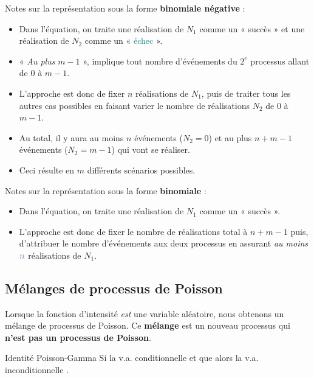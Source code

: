\documentclass[french]{article}
\begin{document}
\begin{multicols*}{2}
Notes sur la représentation sous la forme \textbf{binomiale négative} :
\begin{itemize}
	\item	Dans l'équation, on traite une réalisation de $N_{1}$ comme un « \textcolor{amethyst}{succès} » et une réalisation de $N_{2}$ comme un « \textcolor{teal}{échec} ».
	\item	« \textit{Au plus} $m - 1$ », implique tout nombre d'événements du $2^{e}$ processus allant de $0$ à $m - 1$. 
	\item	L'approche est donc de fixer $n$ réalisations de $N_{1}$, puis de traiter tous les autres cas possibles en faisant varier le nombre de réalisations $N_{2}$ de $0$ à $m - 1$.
	\item	Au total, il y aura au moins $n$ événements ($N_{2} = 0$) et au plus $n + m - 1$ événements  ($N_{2} = m - 1$) qui vont se réaliser.
	\item	Ceci résulte en $m$ différents scénarios possibles. 
\end{itemize}

Notes sur la représentation sous la forme \textbf{binomiale} :
\begin{itemize}
	\item	Dans l'équation, on traite une réalisation de $N_{1}$ comme un « \textcolor{amethyst}{succès} ».
	\item	L'approche est donc de fixer le nombre de réalisations total à $n + m - 1$ puis, d'attribuer le nombre d'événements aux deux processus en assurant \textit{au moins} $\textcolor{amethyst}{n}$ réalisations de $N_{1}$.
\end{itemize}


\columnbreak
\subsection{Mélanges de processus de Poisson}
Lorsque la fonction d'intensité \textit{est} une variable aléatoire, nous obtenons un mélange de processus de Poisson. Ce \textbf{mélange} est un nouveau processus qui \textbf{n'est pas un processus de Poisson}.

\begin{rappel}{Identité Poisson-Gamma}
Si la v.a. conditionnelle  et que  alors la v.a. inconditionnelle .
\end{rappel}



\end{multicols*}
\end{document}
